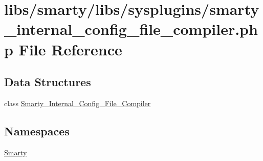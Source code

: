 \hypertarget{smarty__internal__config__file__compiler_8php}{}\section{libs/smarty/libs/sysplugins/smarty\+\_\+internal\+\_\+config\+\_\+file\+\_\+compiler.php File Reference}
\label{smarty__internal__config__file__compiler_8php}
\subsection*{Data Structures}
\begin{DoxyCompactItemize}
\item 
class \hyperlink{class_smarty___internal___config___file___compiler}{Smarty\+\_\+\+Internal\+\_\+\+Config\+\_\+\+File\+\_\+\+Compiler}
\end{DoxyCompactItemize}
\subsection*{Namespaces}
\begin{DoxyCompactItemize}
\item 
 \hyperlink{namespace_smarty}{Smarty}
\end{DoxyCompactItemize}
